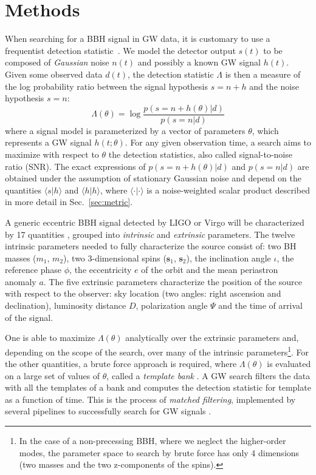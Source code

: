 \documentclass[twocolumn,showpacs,preprintnumbers,nofootinbib,prd,
superscriptaddress,10pt]{revtex4-2}
\newcommand{\scalar}[2]{\langle #1|#2 \rangle}
\begin{document}
\section{Methods} \label{sec:methods}

When searching for a BBH signal in GW data, it is customary to use a frequentist detection statistic~\cite{Creighton_book, Maggiore:2007ulw, Harry:2016ijz, Harry:2017weg}.
We model the detector output $s(t)$ to be composed of {\it Gaussian} noise $n(t)$ and possibly a known GW signal $h(t)$.
Given some observed data $d(t)$, the detection statistic $\Lambda$ is then a measure of the log probability ratio between the signal hypothesis $s = n+h$ and the noise hypothesis $s = n$:
\begin{equation}\label{eq:LL}
	\Lambda(\theta) = \log\frac{p(s = n+h(\theta)|d)}{p(s = n|d)}
\end{equation}
where a signal model is parameterized by a vector of parameters $\theta$, which represents a GW signal $h(t;\theta)$.
For any given observation time, a search aims to maximize with respect to $\theta$ the detection statistics, also called signal-to-noise ratio (SNR).
The exact expressions of $p(s = n+h(\theta)|d)$ and $p(s = n|d)$ are obtained under the assumption of stationary Gaussian noise and  depend on the quantities $\scalar{s}{h}$ and $\scalar{h}{h}$, where $\scalar{\cdot}{\cdot}$ is a noise-weighted scalar product described in more detail in Sec.~\ref{sec:metric}.

A generic eccentric BBH signal detected by LIGO or Virgo will be characterized by 17 quantities \cite{Sathyaprakash_2009}, grouped into \textit{intrinsic} and \textit{extrinsic} parameters.
The twelve intrinsic parameters needed to fully characterize the source consist of: two BH masses ($m_1$, $m_2$), two 3-dimensional spins ($\mathbf{s}_1$, $\mathbf{s}_2$), the inclination angle $\iota$, the reference phase $\phi$, the eccentricity $e$ of the orbit and the mean periastron anomaly $a$.
The five extrinsic parameters characterize the position of the source with respect to the observer: sky location (two angles: right ascension and declination), luminosity distance $D$, polarization angle $\Psi$ and the time of arrival of the signal.

One is able to maximize $\Lambda(\theta)$ analytically over the extrinsic parameters and, depending on the scope of the search, over many of the intrinsic parameters\footnote{
In the case of a non-precessing BBH, where we neglect the higher-order modes, the parameter space to search by brute force has only 4 dimensions (two masses and the two z-components of the spins).
}.
For the other quantities, a brute force approach is required, where $\Lambda(\theta)$ is evaluated on a large set of values of $\theta$, called a {\it template bank} \cite{PhysRevD.77.104017, Mukherjee:2018yra}.
A GW search filters the data with all the templates of a bank and computes the detection statistic for template as a function of time. This is the process of {\it matched filtering}, implemented by several pipelines to successfully search for GW signals \cite{Privitera:2013xza, Usman:2015kfa, Capano:2016dsf, PhysRevD.95.042001, gstlal_paper2, Aubin:2020goo, Chu:2020pjv}.
\end{document}
